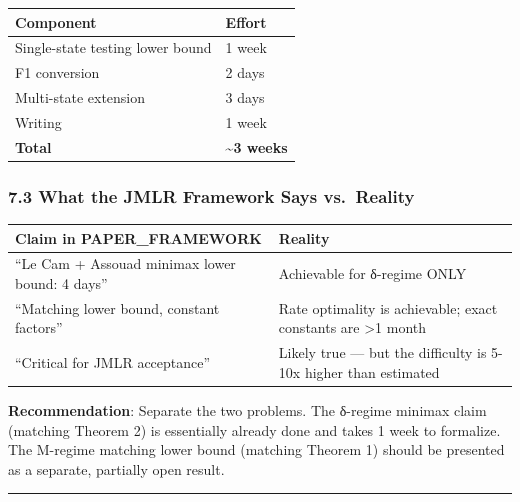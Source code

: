 \documentclass[
  12pt,
]{article}
\begin{document}
\begin{longtable}[]{@{}ll@{}}
\toprule\noalign{}
Component & Effort \\
\midrule\noalign{}
\endhead
\bottomrule\noalign{}
\endlastfoot
Single-state testing lower bound & 1 week \\
F1 conversion & 2 days \\
Multi-state extension & 3 days \\
Writing & 1 week \\
\textbf{Total} & \textbf{\textasciitilde3 weeks} \\
\end{longtable}

\subsubsection{7.3 What the JMLR Framework Says
vs.~Reality}\label{what-the-jmlr-framework-says-vs.-reality}

\begin{longtable}[]{@{}
  >{\raggedright\arraybackslash}p{}
  >{\raggedright\arraybackslash}p{}@{}}
\toprule\noalign{}
\begin{minipage}[b]{\linewidth}\raggedright
Claim in PAPER\_FRAMEWORK
\end{minipage} & \begin{minipage}[b]{\linewidth}\raggedright
Reality
\end{minipage} \\
\midrule\noalign{}
\endhead
\bottomrule\noalign{}
\endlastfoot
``Le Cam + Assouad minimax lower bound: 4 days'' & Achievable for
δ-regime ONLY \\
``Matching lower bound, constant factors'' & Rate optimality is
achievable; exact constants are \textgreater1 month \\
``Critical for JMLR acceptance'' & Likely true --- but the difficulty is
5-10x higher than estimated \\
\end{longtable}

\textbf{Recommendation}: Separate the two problems. The δ-regime minimax
claim (matching Theorem 2) is essentially already done and takes 1 week
to formalize. The M-regime matching lower bound (matching Theorem 1)
should be presented as a separate, partially open result.

\begin{center}\rule{0.5\linewidth}{0.5pt}\end{center}
\end{document}
